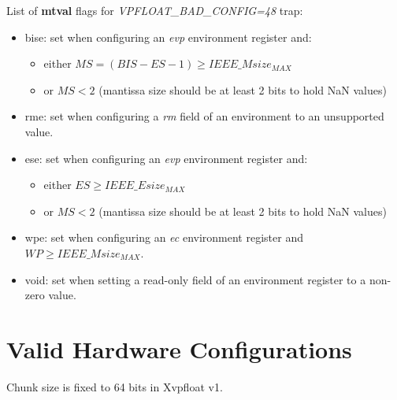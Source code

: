 List of \textbf{mtval} flags for {\em VPFLOAT\_BAD\_CONFIG=48} trap:
\begin{itemize}[topsep=0pt]
    \item bise: set when configuring an {\em evp} environment register and:
    \begin{itemize}[noitemsep,topsep=0pt]
        \item either $MS=(BIS-ES-1) \geq IEEE\_Msize_{MAX}$
        \item or $MS < 2$ (mantissa size should be at least 2 bits to hold NaN values)
    \end{itemize}
    \item rme: set when configuring a {\em rm} field of an environment to an unsupported value.
    \item ese: set when configuring an {\em evp} environment register and:
    \begin{itemize}[noitemsep,topsep=0pt]
        \item either $ES \geq IEEE\_Esize_{MAX}$
        \item or $MS < 2$ (mantissa size should be at least 2 bits to hold NaN values)
    \end{itemize}
    \item wpe: set when configuring an {\em ec} environment register and $WP \geq IEEE\_Msize_{MAX}$.
    \item void: set when setting a read-only field of an environment register to a non-zero value.
\end{itemize}

\section{Valid Hardware Configurations}
\label{sec:hard_cfg}

Chunk size is fixed to 64 bits in Xvpfloat v1.

